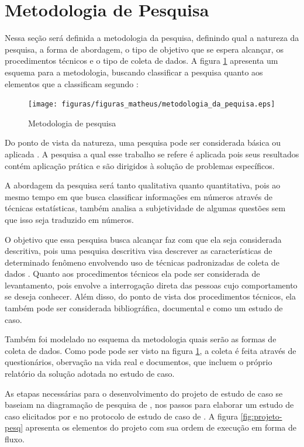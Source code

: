 \section{Metodologia de Pesquisa}

Nessa seção será definida a metodologia da pesquisa, definindo qual a natureza da pesquisa, a forma de abordagem, o tipo de objetivo que se espera alcançar, os procedimentos técnicos e o tipo de coleta de dados. A figura \ref{fig:metodologiadepesquisa} apresenta um esquema para a metodologia, buscando classificar a pesquisa quanto aos elementos que a classificam segundo :

\begin{figure}[h!]
\centering
\texttt{[image: figuras/figuras\_matheus/metodologia\_da\_pequisa.eps]}
\caption{Metodologia de pesquisa}
\label{fig:metodologiadepesquisa}
\end{figure}
\FloatBarrier

Do ponto de vista da natureza, uma pesquisa pode ser considerada básica ou aplicada \cite{metodologia_edna}. A pesquisa a qual esse trabalho se refere é aplicada pois seus resultados contém aplicação prática e são dirigidos à solução de problemas específicos.

A abordagem da pesquisa será tanto qualitativa quanto quantitativa, pois ao mesmo tempo em que busca classificar informações em números através de técnicas estatísticas, também analisa a subjetividade de algumas questões sem que isso seja traduzido em números.

O objetivo que essa pesquisa busca alcançar faz com que ela seja considerada descritiva, pois uma pesquisa descritiva visa descrever as características de determinado fenômeno envolvendo uso de técnicas padronizadas de coleta de dados \cite{metodologia_edna}. Quanto aos procedimentos técnicos ela pode ser considerada de levantamento, pois envolve a interrogação direta das pessoas cujo comportamento se deseja conhecer. Além disso, do ponto de vista dos procedimentos técnicos, ela também pode ser considerada bibliográfica, documental e como um estudo de caso.

Também foi modelado no esquema da metodologia quais serão as formas de coleta de dados. Como pode pode ser visto na figura \ref{fig:metodologiadepesquisa}, a coleta é feita através de questionários, obervação na vida real e documentos, que incluem o próprio relatório da solução adotada no estudo de caso.

As etapas necessárias para o desenvolvimento do projeto de estudo de caso se baseiam na diagramação de pesquisa de , nos passos para elaborar um estudo de caso elicitados por  e no protocolo de estudo de caso de . A figura \ref{fig:projeto-pesq} apresenta os elementos do projeto com sua ordem de execução em forma de fluxo.


